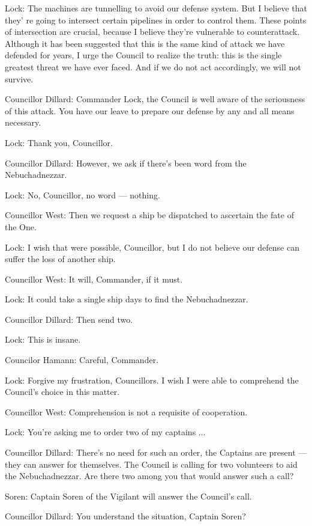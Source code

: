 \documentclass[UTF8]{ctexart}
\newenvironment{myquote}{\color{green} \setlength{\leftskip}{6em} \setlength{\rightskip}{4em} \setlength{\parindent}{-2em}}{\par}
\begin{document}
\begin{myquote}
Lock: The machines are tunnelling to avoid our defense system. But I believe that they' re going to intersect certain pipelines in order to control them. These points of intersection are crucial, because I believe they're vulnerable to counterattack. Although it has been suggested that this is the same kind of attack we have defended for years, I urge the Council to realize the truth: this is the single greatest threat we have ever faced. And if we do not act accordingly, we will not survive.

Councillor Dillard: Commander Lock, the Council is well aware of the seriousness of this attack. You have our leave to prepare our defense by any and all means necessary.

Lock: Thank you, Councillor.

Councillor Dillard: However, we ask if there's been word from the Nebuchadnezzar.

Lock: No, Councillor, no word --- nothing.

Councillor West: Then we request a ship be dispatched to ascertain the fate of the One.

Lock: I wish that were possible, Councillor, but I do not believe our defense can suffer the loss of another ship.

Councillor West: It will, Commander, if it must.

Lock: It could take a single ship days to find the Nebuchadnezzar.

Councillor Dillard: Then send two.

Lock: This is insane.

Councilor Hamann: Careful, Commander.

Lock: Forgive my frustration, Councillors. I wish I were able to comprehend the Council's choice in this matter.

Councillor West: Comprehension is not a requisite of cooperation.

Lock: You're asking me to order two of my captains ...

Councillor Dillard: There's no need for such an order, the Captains are present --- they can answer for themselves. The Council is calling for two volunteers to aid the Nebuchadnezzar. Are there two among you that would answer such a call?

Soren: Captain Soren of the Vigilant will answer the Council's call.

Councillor Dillard: You understand the situation, Captain Soren?


\end{myquote}
\end{document}
